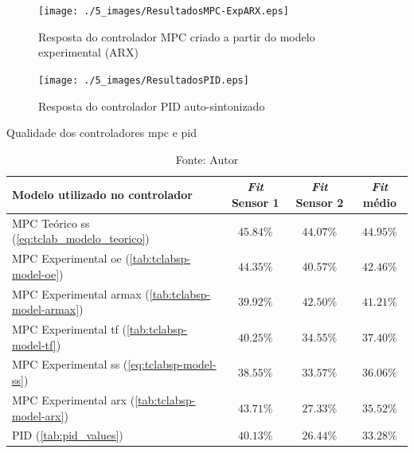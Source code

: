 \begin{figure}[!h]
	\caption{Resposta do controlador MPC criado a partir do modelo experimental (ARX)}
	\begin{center}
		\texttt{[image: ./5\_images/ResultadosMPC-ExpARX.eps]} 
		\label{fig:resultadosmpc-exparx}
	\end{center}
	\centering
\end{figure}

\begin{figure}[!h]
	\caption{Resposta do controlador PID auto-sintonizado}
	\begin{center}
		\texttt{[image: ./5\_images/ResultadosPID.eps]} 
		\label{fig:resultadospid}
	\end{center}
	\centering
\end{figure}

\begin{table}[!h]
	\centering
	\caption{Qualidade dos controladores \acrshort{mpc} e \acrshort{pid}}
	\label{tab:resultados_mpc_e_pid}
	\begin{tabular}{l|cc|c} \toprule
		{Modelo utilizado no controlador}              			            &	{\textit{Fit} Sensor 1}	    &	{\textit{Fit} Sensor 2}     & {\textit{Fit} médio}			    \\ \midrule
		MPC Teórico \acrshort{ss} (\cref{eq:tclab_modelo_teorico})	        &   $45.84\%$                   &   $44.07\%$                   &   $44.95\%$                       \\ 
		MPC Experimental \acrshort{oe} (\cref{tab:tclabsp-model-oe})	    &   $44.35\%$                   &   $40.57\%$                   &   $42.46\%$                       \\ 
		MPC Experimental \acrshort{armax} (\cref{tab:tclabsp-model-armax})	&   $39.92\%$                   &   $42.50\%$                   &   $41.21\%$                       \\ 
		MPC Experimental \acrshort{tf} (\cref{tab:tclabsp-model-tf})		&   $40.25\%$                   &   $34.55\%$                   &   $37.40\%$                       \\ 
		MPC Experimental \acrshort{ss} (\cref{eq:tclabsp-model-ss})			&   $38.55\%$                   &   $33.57\%$                   &   $36.06\%$                       \\ 
		MPC Experimental \acrshort{arx}	(\cref{tab:tclabsp-model-arx})		&   $43.71\%$                   &   $27.33\%$                   &   $35.52\%$                       \\ 
		PID (\cref{tab:pid_values})	                                        &   $40.13\%$                   &   $26.44\%$                   &   $33.28\%$                       \\ \bottomrule 
	\end{tabular}
	\caption*{Fonte: Autor}
\end{table}
